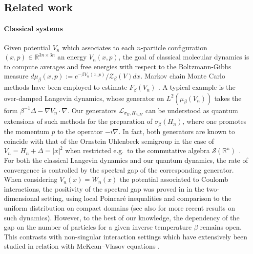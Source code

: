\documentclass[11pt]{amsart}
\newcommand{\1}{\mathbbm{1}}
\newcommand{\cL}{\mathcal{L}}
\theoremstyle{plain}
\theoremstyle{definition}
\theoremstyle{remark}
\numberwithin{equation}{section}
\begin{document}
\subsection{Related work}


\paragraph{\textbf{Classical systems}}
Given potential $V_n$ which associates to each $n$-particle configuration $(x,p)\in\mathbb{R}^{3n\times 3n}$ an energy $V_n(x,p)$, the goal of classical molecular dynamics is to compute averages and free energies with respect to the Boltzmann-Gibbs measure $d\mu_\beta(x,p):=e^{-\beta V_n(x,p)}/\mathcal{Z}_\beta(V) dx$. Markov chain Monte Carlo methods have been employed to estimate $F_\beta(V_n)$ \cite{rousset2010free,chafai2019simulating,chafai2021coulomb}. A typical example is the over-damped Langevin dynamics, whose generator on $L^2(\mu_\beta(V_n))$ takes the form $\beta^{-1}\Delta -\nabla V_n\cdot \nabla$. Our generators $\cL_{\sigma_E,H_{n,M}}$ can be understood as quantum extensions of such methods for the preparation of $\sigma_\beta(H_n)$, where one promotes the momentum $p$ to the operator $-i\nabla$. In fact, both generators are known to coincide with that of the Ornstein Uhlenbeck semigroup in the case of $V_n=H_n+\Delta=|x|^2$ when restricted e.g.~to the commutative algebra $\mathcal{S}(\mathbb{R}^n)$ \cite{OU}. For both the classical Langevin dynamics and our quantum dynamics, the rate of convergence is controlled by the spectral gap of the corresponding generator. When considering $V_n(x)=W_n(x)$ the potential associated to Coulomb interactions, the positivity of the spectral gap was proved in \cite{Bolley2018} in the two-dimensional setting, using local Poincaré inequalities and comparison to the uniform distribution on compact domains (see also \cite{chafai2021aspects,Bourgade2019,Akemann2019,Chafa2020,lu2020geometric,Duong2024} for more recent results on such dynamics). However, to the best of our knowledge, the dependency of the gap on the number of particles for a given inverse temperature $\beta$ remains open. This contrasts with non-singular interaction settings which have extensively been studied in relation with McKean--Vlasov equations \cite{Malrieu2001,Mlard1996,Sznitman1991}.


\smallskip
\end{document}

